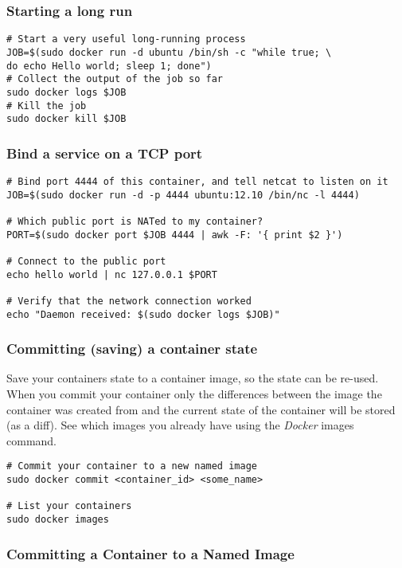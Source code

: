 \documentclass[11pt]{article}
\begin{document}
\subsubsection{Starting a long run}
\label{sec-2-3-5}


\begin{verbatim}
# Start a very useful long-running process
JOB=$(sudo docker run -d ubuntu /bin/sh -c "while true; \
do echo Hello world; sleep 1; done")
# Collect the output of the job so far
sudo docker logs $JOB
# Kill the job
sudo docker kill $JOB
\end{verbatim}
\subsubsection{Bind a service on a TCP port}
\label{sec-2-3-6}


\begin{verbatim}
# Bind port 4444 of this container, and tell netcat to listen on it
JOB=$(sudo docker run -d -p 4444 ubuntu:12.10 /bin/nc -l 4444)

# Which public port is NATed to my container?
PORT=$(sudo docker port $JOB 4444 | awk -F: '{ print $2 }')

# Connect to the public port
echo hello world | nc 127.0.0.1 $PORT

# Verify that the network connection worked
echo "Daemon received: $(sudo docker logs $JOB)"
\end{verbatim}
\subsubsection{Committing (saving) a container state}
\label{sec-2-3-7}

Save your containers state to a container image, so the state can be re-used.
When you commit your container only the differences between the image the container was created from and the current state of the container will be stored (as a diff). See which images you already have using the \emph{Docker} images command.

\begin{verbatim}
# Commit your container to a new named image
sudo docker commit <container_id> <some_name>

# List your containers
sudo docker images
\end{verbatim}
\subsubsection{Committing a Container to a Named Image}
\label{sec-2-3-8}
\end{document}
